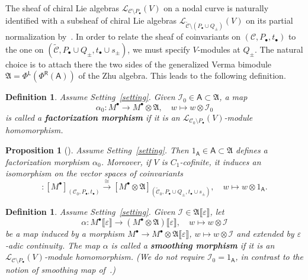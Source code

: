 \documentclass[12pt,a4paper,reqno]{amsart}
\numberwithin{equation}{section}
\newtheorem{proposition}[theorem]{Proposition}
\newtheorem{definition}[theorem]{Definition}
\theoremstyle{definition}
\newcommand{\I}{\mathscr{I}}
\newcommand{\CCC}{\mathscr{C}}
\newcommand{\LL}{\mathcal{L}}
\newcommand{\lb}{\llbracket}
\newcommand{\rb}{\rrbracket}
\def\L{\mathsf{L}}
\def\R{\mathsf{R}}
\def\fA{\mathfrak{A}}
\def\A{\mathsf{A}}
\begin{document}
The sheaf of chiral Lie algebras $\LL_{\CCC \setminus P_\bullet}(V)$ on a nodal curve is naturally identified with a subsheaf of chiral Lie algebras $\LL_{\widetilde{\CCC} \setminus (P_\bullet \cup Q_\pm)}(V)$ on its partial normalization by~\cite[Proposition 3.3.2]{DGT2}. In order to relate the sheaf of coinvariants on $(\CCC,P_\bullet, t_\bullet)$ to the one on $(\widetilde{\CCC},P_\bullet\cup Q_\pm, t_\bullet\cup s_\pm)$, we must specify $V$-modules at $Q_\pm$. The natural choice is to attach there the two sides of the generalized Verma bimodule $\fA=\Phi^\L(\Phi^\R(\A))$ of the Zhu algebra. This leads to the following definition.
\begin{definition}
    Assume Setting~\ref{setting}. Given $\I_0 \in \A \subset \fA$, a map
    \begin{equation}
         \alpha_0: M^\bullet \longrightarrow M^\bullet \otimes \mathfrak{A}, \quad w \mapsto w \otimes \I_0
    \end{equation}
    is called a \textbf{factorization morphism} if it is an $\LL_{\CCC_0 \setminus P_\bullet}(V)$-module homomorphism.
\end{definition}
\begin{proposition}[{\cite[Lemma 4.4.4]{DGK2}}]\label{prop:FM}
    Assume Setting~\ref{setting}. Then $1_\A \in \A \subset \fA$ defines a factorization morphism $\alpha_0$. Moreover, if $V$ is $C_1$-cofinite, it induces an isomorphism on the vector spaces of coinvariants
    \begin{equation}
         [\alpha_0]: [M^\bullet]_{(\CCC_0,P_\bullet,t_\bullet)} \stackrel{\cong}{\longrightarrow} [M^\bullet \otimes \fA]_{(\widetilde{\CCC}_0,P_\bullet \cup Q_\pm,t_\bullet \cup s_\pm)}, \quad w \mapsto w \otimes 1_{\A}.
    \end{equation}
\end{proposition}
\begin{definition}\label{def:smoothingmorphism}
    Assume Setting~\ref{setting}. Given $\I \in \fA\lb \varepsilon\rb $, let
    \begin{equation}
         \alpha: M^\bullet\lb \varepsilon\rb  \longrightarrow (M^\bullet \otimes \fA)\lb \varepsilon\rb, \quad w \mapsto w \otimes \I
    \end{equation}
    be a map induced by a morphism $M^\bullet \rightarrow M^\bullet \otimes \fA\lb \varepsilon\rb $, $w\mapsto w \otimes \I$ and extended by $\varepsilon$-adic continuity. The map $\alpha$ is called a \textbf{smoothing morphism} if it is an $\LL_{\CCC\setminus P_\bullet}(V)$-module homomorphism. (We do not require $\I_0=1_\A$, in contrast to the notion of smoothing map of~\cite[Section 5]{DGK2}.)
\end{definition}
\end{document}
